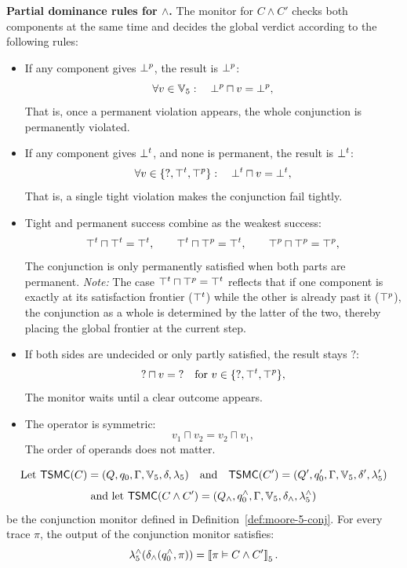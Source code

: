 \noindent
\textbf{Partial dominance rules for $\wedge$.}
The monitor for $C \wedge C'$ checks both components at the same time and decides the global verdict according to the following rules:

\begin{itemize}
  \item If any component gives $\bot^p$, the result is $\bot^p$:
  \[
  \forall v\in\mathbb{V}_5 :\quad \bot^p \sqcap v = \bot^p,
  \]
  That is, once a permanent violation appears, the whole conjunction is permanently violated.
  \item If any component gives $\bot^t$, and none is permanent, the result is $\bot^t$:
  \[
  \forall v\in\{\mathsf{?},\top^t,\top^p\}:\quad \bot^t \sqcap v = \bot^t,
  \]
  That is, a single tight violation makes the conjunction fail tightly.
  \item Tight and permanent success combine as the weakest success:
  \[
  \top^t \sqcap \top^t = \top^t,\qquad
  \top^t \sqcap \top^p = \top^t,\qquad
  \top^p \sqcap \top^p = \top^p,
  \]
  The conjunction is only permanently satisfied when both parts are permanent.
  \emph{Note:} The case $\top^t \sqcap \top^p = \top^t$ reflects that if one component is exactly at its satisfaction frontier ($\top^t$) while the other is already past it ($\top^p$), the conjunction as a whole is determined by the latter of the two, thereby placing the global frontier at the current step.
  \item If both sides are undecided or only partly satisfied, the result stays $\mathsf{?}$:
  \[
  \mathsf{?}\sqcap v = \mathsf{?}\quad\text{for }v\in\{\mathsf{?},\top^t,\top^p\},
  \]
  The monitor waits until a clear outcome appears.
  \item The operator is symmetric:
  \[
  v_1\sqcap v_2 = v_2\sqcap v_1,
  \]
  The order of operands does not matter.
\end{itemize}


\begin{lemma}
\label{lem:conj-correct}
\[\text{Let }
\mathsf{TSMC}(C)  = (Q, q_0, \Gamma, \mathbb{V}_5 , \delta, \lambda_5)
\quad\text{and}\quad
\mathsf{TSMC}(C') = (Q', q'_0, \Gamma, \mathbb{V}_5 , \delta', \lambda'_5)
\]
\[\text{and let }
\mathsf{TSMC}(C \wedge C')
  = (Q_{\wedge}, q_0^{\wedge}, \Gamma, \mathbb{V}_5 , \delta_{\wedge}, \lambda_5^{\wedge})
\]
be the conjunction monitor defined in Definition~\ref{def:moore-5-conj}.
For every trace $\pi$, the output of the conjunction monitor satisfies:
\[
\lambda_5^{\wedge}(\delta_\wedge(q_0^\wedge,\pi))=
\left\llbracket \pi \vDash C \wedge C' \right\rrbracket_{5}.\]
\end{lemma}

